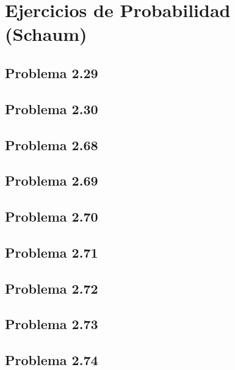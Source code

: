 \documentclass[12pt]{article}
\begin{document}
\section*{Ejercicios de Probabilidad (Schaum)}

\subsection*{Problema 2.29}


\subsection*{Problema 2.30}


\subsection*{Problema 2.68}

\subsection*{Problema 2.69}


\subsection*{Problema 2.70}


\subsection*{Problema 2.71}

\subsection*{Problema 2.72}

\subsection*{Problema 2.73}

\subsection*{Problema 2.74}
\end{document}
